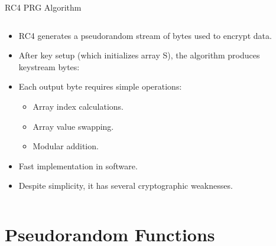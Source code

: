 \documentclass[aspectratio=169, lualatex, handout]{beamer}
\begin{document}
\begin{frame}[fragile]{RC4 PRG Algorithm}
	\begin{columns}[c]
		\begin{column}{0.55\textwidth}
			\begin{itemize}
				\item RC4 generates a pseudorandom stream of bytes used to encrypt data.
				\item After key setup (which initializes array S), the algorithm produces keystream bytes:
				\item Each output byte requires simple operations:
				      \begin{itemize}
					      \item Array index calculations.
					      \item Array value swapping.
					      \item Modular addition.
				      \end{itemize}
				\item Fast implementation in software.
				\item Despite simplicity, it has several cryptographic weaknesses.
			\end{itemize}
		\end{column}
		\begin{column}{0.45\textwidth}
		\end{column}
	\end{columns}
\end{frame}

\section{Pseudorandom Functions}
\end{document}
